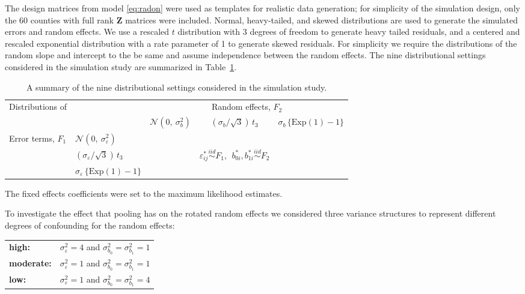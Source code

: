 \documentclass[12pt]{article} %
\begin{document}
The design matrices from model \eqref{eq:radon} were used as templates for realistic data generation;  for simplicity of the simulation design, only the 60 counties with full rank $\bm{Z}$ matrices were included. 
Normal, heavy-tailed, and skewed distributions are used to generate the simulated errors and random effects. We use a rescaled $t$ distribution with 3 degrees of freedom to generate heavy tailed residuals, and a centered and rescaled exponential distribution with a rate parameter of 1 to generate skewed residuals. For simplicity we require the distributions of the random slope and intercept to the be same and assume independence between the random effects. The nine distributional settings considered in the simulation study are summarized in Table~\ref{tab:simdsns}.
%
\begin{table}[htdp]
\centering
\caption{\label{tab:simdsns} A summary of the nine distributional settings considered in the simulation study.}
\begin{tabular}{llccc}\hline
Distributions of & & \multicolumn{3}{c}{Random effects, $F_2$} \\ \cline{3-5}
           & & $\mathcal{N}(0, \ \sigma^2_{b})$ & $(\sigma_{b} / \sqrt{3})\, t_3$ & $\sigma_{b} \, \{ \text{Exp}(1) - 1 \}$ \\ \hline
Error terms, $F_1$  & $\mathcal{N}(0, \ \sigma^2_{\varepsilon})$       & &&\\
             & $(\sigma_{\varepsilon} / \sqrt{3})\, t_3$  &  & $\varepsilon_{ij}^* \overset{iid}{\sim} F_1, \ \ b_{0i}^*, b_{1i}^* \overset{iid}{\sim} F_2$ &  \\
             & $\sigma_{\varepsilon} \, \{ \text{Exp}(1) - 1 \}$       & && \\ 
\hline
\end{tabular} 
\end{table}
%
The fixed effects coefficients were set to the maximum likelihood estimates.

To investigate the effect that pooling has on the rotated random effects we considered  three variance structures to represent different degrees of confounding for the random effects:\\
%
\begin{tabular}{ll}
\textbf{high:} & $\sigma^2_\varepsilon = 4$ and  $\sigma^2_{b_0} = \sigma^2_{b_1} = 1$ \\
\textbf{moderate:} & $\sigma^2_\varepsilon = 1$ and  $\sigma^2_{b_0} = \sigma^2_{b_1} = 1$ \\
\textbf{low:} & $\sigma^2_\varepsilon = 1$ and  $\sigma^2_{b_0} = \sigma^2_{b_1} = 4$ \\
\end{tabular}
%
\end{document}
